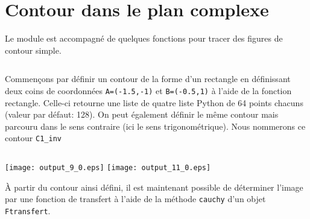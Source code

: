 \section{Contour dans le plan complexe\label{contour-dans-le-plan-complexe}}
Le module est accompagné de quelques fonctions pour tracer des figures
de contour simple.
\begin{tcolorbox}[breakable, size=fbox, boxrule=1pt, 
    pad at break*=1mm,colback=cellbackground, colframe=cellborder]
\inputminted{python}{codes/python/annexe_cauchy_cellule4.py}
\end{tcolorbox}

Commençons par définir un contour de la forme d'un rectangle en
définissant deux coins de coordonnées \texttt{A=(-1.5,-1)} et
\texttt{B=(-0.5,1)} à l'aide de la fonction rectangle. Celle-ci retourne
une liste de quatre liste Python de 64 points chacuns (valeur par
défaut: 128).
On peut également définir le même contour mais parcouru dans le sens
contraire (ici le sens trigonométrique). Nous nommerons ce contour
\texttt{C1\_inv}

\begin{tcolorbox}[breakable, size=fbox, boxrule=1pt, 
    pad at break*=1mm,colback=cellbackground, colframe=cellborder]
\inputminted{python}{codes/python/annexe_cauchy_cellule5.py}
\end{tcolorbox}
\begin{center}
    \texttt{[image: output\_9\_0.eps]}
    \texttt{[image: output\_11\_0.eps]}
\end{center}
À partir du contour ainsi défini, il est maintenant possible de déterminer 
l'image par une fonction de transfert à l'aide de la méthode \texttt{cauchy}
d'un objet \texttt{Ftransfert}.
